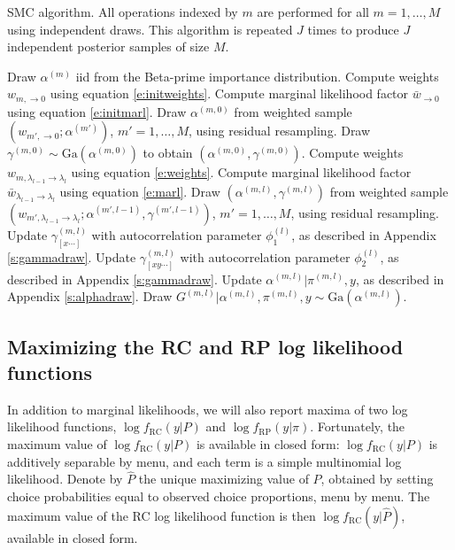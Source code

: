 \documentclass[11pt,letter]{article}
\begin{document}
\begin{algorithm}
\caption{SMC algorithm. All operations indexed by $m$ are performed for all $m=1,\ldots,M$ using independent draws.
This algorithm is repeated $J$ times to produce $J$ independent posterior samples of size $M$.}\label{a:a1}
\begin{algorithmic}[5]
  \STATE Draw $\alpha^{(m)}$ iid from the Beta-prime importance distribution.
  \STATE Compute weights $w_{m,\to 0}$ using equation \eqref{e:initweights}.
  \STATE Compute marginal likelihood factor $\bar{w}_{\to 0}$ using equation \eqref{e:initmarl}.
  \STATE Draw $\alpha^{(m,0)}$ from weighted sample $(w_{m',\to 0};\alpha^{(m')})$, $m' = 1,\ldots,M$, using residual resampling.
  \STATE Draw $\gamma^{(m,0)} \sim \mathrm{Ga}(\alpha^{(m,0)})$ to obtain $(\alpha^{(m,0)},\gamma^{(m,0)})$.
    \STATE Compute weights $w_{m,\lambda_{l-1} \to \lambda_l}$ using equation \eqref{e:weights}.
    \STATE Compute marginal likelihood factor $\bar{w}_{\lambda_{l-1} \to \lambda_l}$ using equation \eqref{e:marl}.
    \STATE Draw $(\alpha^{(m,l)},\gamma^{(m,l)})$ from weighted sample
    $(w_{m',\lambda_{l-1} \to \lambda_l};\alpha^{(m',l-1)},\gamma^{(m',l-1)})$,
    $m' = 1,\ldots,M$, using residual resampling.
        \STATE Update $\gamma^{(m,l)}_{[x\cdots]}$ with autocorrelation parameter $\phi_1^{(l)}$, as described in Appendix \ref{s:gammadraw}.
      \ENDFOR
    \ENDFOR
        \STATE Update $\gamma^{(m,l)}_{[xy\cdots]}$ with autocorrelation parameter $\phi_2^{(l)}$, as described in Appendix \ref{s:gammadraw}.
      \ENDFOR
    \ENDFOR
    \STATE Update $\alpha^{(m,l)}|\pi^{(m,l)},y$, as described in Appendix \ref{s:alphadraw}.
    \STATE Draw $G^{(m,l)}|\alpha^{(m,l)},\pi^{(m,l)},y \sim \mathrm{Ga}(\alpha^{(m,l)})$.
  \ENDFOR
\end{algorithmic}
\end{algorithm}

\subsection{Maximizing the RC and RP log likelihood functions}

In addition to marginal likelihoods, we will also report maxima of two log likelihood functions, $\log f_\mathrm{RC}(y|P)$ and $\log f_\mathrm{RP}(y|\pi)$.
Fortunately, the maximum value of $\log f_\mathrm{RC}(y|P)$ is available in closed form: $\log f_\mathrm{RC}(y|P)$ is additively separable by menu, and each term is a simple multinomial log likelihood.
Denote by $\hat{P}$ the unique maximizing value of $P$, obtained by setting choice probabilities equal to observed choice proportions, menu by menu.
The maximum value of the RC log likelihood function is then $\log f_\mathrm{RC}(y|\hat{P})$, available in closed form.
\end{document}
